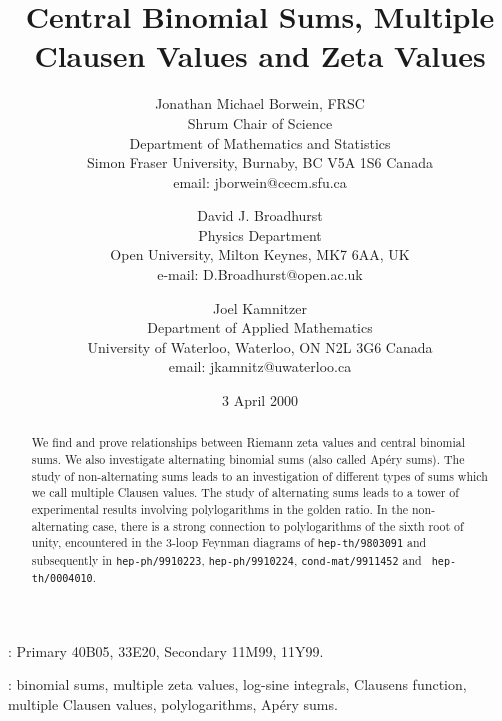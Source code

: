\documentclass[a4paper,a4paper]{article}
\begin{document}
\title{\bf Central Binomial Sums, Multiple Clausen Values and Zeta
Values}

\author{Jonathan Michael Borwein, FRSC\\
Shrum Chair of Science\\
Department of Mathematics and Statistics\\
Simon Fraser University, Burnaby, BC V5A 1S6 Canada\\
email: jborwein@cecm.sfu.ca
\and
David J. Broadhurst \\
Physics Department \\
Open University, Milton Keynes, MK7 6AA, UK\\
e-mail: D.Broadhurst@open.ac.uk
\and
Joel Kamnitzer\\
Department of Applied Mathematics\\
University of Waterloo, Waterloo, ON N2L 3G6 Canada\\
email: jkamnitz@uwaterloo.ca
}


\date{3 April 2000}

\maketitle

\begin{abstract}\noindent
We find and prove relationships between Riemann zeta values and central
binomial sums. We also investigate alternating binomial sums (also called
Ap\'ery sums). The study of non-alternating sums leads to an investigation of
different types of sums which we call multiple Clausen values. The study of
alternating sums leads to a tower of experimental results involving
polylogarithms in the golden ratio. In the non-alternating case, there is a
strong connection to polylogarithms of the sixth root of unity, encountered
in the 3-loop Feynman diagrams of {\tt hep-th/9803091} and subsequently in
{\tt hep-ph/9910223}, {\tt hep-ph/9910224}, {\tt cond-mat/9911452} and {\tt
hep-th/0004010}.
\end{abstract}

\vspace{\baselineskip}
\vfill
{}: Primary 40B05, 33E20,
Secondary 11M99, 11Y99.

:
binomial sums, multiple zeta values, log-sine integrals, Clausens
function, multiple Clausen values, polylogarithms, Ap\'ery sums.
\vspace{2true cm}
\end{document}
